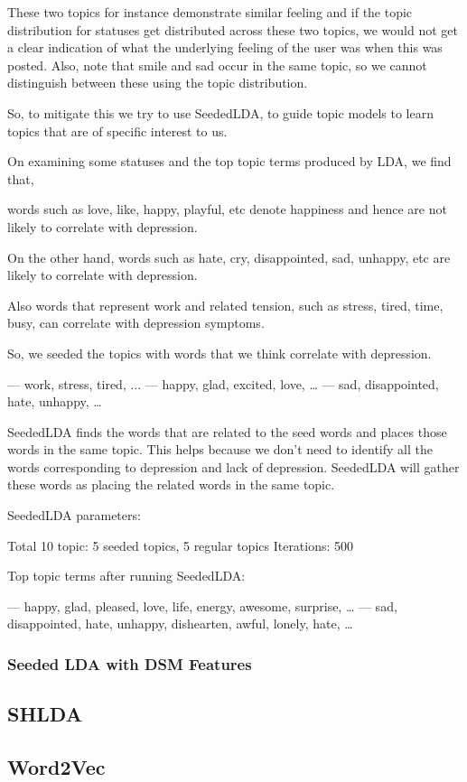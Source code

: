 These two topics for instance demonstrate similar feeling and if the topic distribution for statuses get distributed across these two topics, we would not get a clear indication of what the underlying feeling of the user was when this was posted.
Also, note that smile and sad occur in the same topic, so we cannot distinguish between these using the topic distribution.

So, to mitigate this we try to use SeededLDA, to guide topic models to learn topics that are of specific interest to us.

On examining some statuses and the top topic terms produced by LDA, we find that,

words such as love, like, happy, playful, etc denote happiness and hence are not likely to correlate with depression.

On the other hand, words such as hate, cry, disappointed, sad, unhappy, etc are likely to correlate with depression.

Also words that represent work and related tension, such as stress, tired, time, busy, can correlate with depression symptoms.

So, we seeded the topics with words that we think correlate with depression.

--- work, stress, tired, ...
--- happy, glad, excited, love, …
--- sad, disappointed, hate, unhappy, …

SeededLDA finds the words that are related to the seed words and places those words in the same topic. This helps because we don't need to identify all the words corresponding to depression and lack of depression. SeededLDA will gather these words as placing the related words in the same topic.

SeededLDA parameters:

Total 10 topic: 5 seeded topics, 5 regular topics
Iterations: 500

Top topic terms after running SeededLDA:

--- happy, glad, pleased, love, life, energy, awesome, surprise, …
--- sad, disappointed, hate, unhappy, dishearten, awful, lonely, hate, …

\subsubsection{Seeded LDA with DSM Features}



\subsection{SHLDA}
\subsection{Word2Vec}
\label{model}
